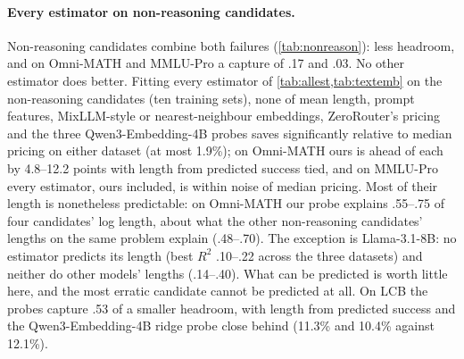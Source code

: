 \documentclass[10pt]{article}
\begin{document}
\paragraph{Every estimator on non-reasoning candidates.}
Non-reasoning candidates combine both failures (\cref{tab:nonreason}): less headroom, and on Omni-MATH and MMLU-Pro a capture of .17 and .03. No other estimator does better. Fitting every estimator of \cref{tab:allest,tab:textemb} on the non-reasoning candidates (ten training sets), none of mean length, prompt features, MixLLM-style or nearest-neighbour embeddings, ZeroRouter's pricing and the three Qwen3-Embedding-4B probes saves significantly relative to median pricing on either dataset (at most 1.9\%); on Omni-MATH ours is ahead of each by 4.8--12.2 points with length from predicted success tied, and on MMLU-Pro every estimator, ours included, is within noise of median pricing. Most of their length is nonetheless predictable: on Omni-MATH our probe explains .55--.75 of four candidates' log length, about what the other non-reasoning candidates' lengths on the same problem explain (.48--.70). The exception is Llama-3.1-8B: no estimator predicts its length (best $R^2$ .10--.22 across the three datasets) and neither do other models' lengths (.14--.40). What can be predicted is worth little here, and the most erratic candidate cannot be predicted at all. On LCB the probes capture .53 of a smaller headroom, with length from predicted success and the Qwen3-Embedding-4B ridge probe close behind (11.3\% and 10.4\% against 12.1\%).

\FloatBarrier
\end{document}
